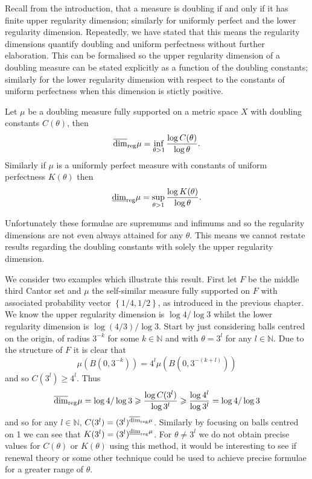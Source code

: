 Recall from the introduction, that a measure is doubling if and only if it has finite upper regularity dimension; similarly for uniformly perfect and the lower regularity dimension. Repeatedly, we have stated that this means the regularity dimensions quantify doubling and uniform perfectness without further elaboration. This can be formalised so the upper regularity dimension of a doubling measure can be stated explicitly as a function of the doubling constants; similarly for the lower regularity dimension with respect to the constants of uniform perfectness when this dimension is stictly positive. 

\begin{theorem}\label{ch-quantifying:equivalence}
Let $\mu$ be a doubling measure fully supported on a metric space $X$ with doubling constants $C(\theta)$, then $$\overline{\dim}_{\textup{reg}} \mu = \inf_{\theta > 1}\frac{\log C(\theta)}{\log \theta}.$$ Similarly if $\mu$ is a uniformly perfect measure with constants of uniform perfectness $K(\theta)$ then $$\underline{\dim}_{\textup{reg}} \mu = \sup_{\theta > 1} \frac{\log K(\theta)}{\log \theta}.$$
\end{theorem}


Unfortunately these formulae are supremums and infimums and so the regularity dimensions are not even always attained for any $\theta$. This means we cannot restate results regarding the doubling constants with solely the upper regularity dimension.

We consider two examples which illustrate this result. First let $F$ be the middle third Cantor set and $\mu$ the self-similar measure fully supported on $F$ with associated probability vector $\left\{ 1/4, 1/2 \right\}$, as introduced in the previous chapter. We know the upper regularity dimension is $\log 4 / \log 3$ whilst the lower regularity dimension is $\log(4/3) / \log 3$. Start by just considering balls centred on the origin, of radius $3^{-k}$ for some $k \in \mathbb{N}$ and with $\theta = 3^{l}$ for any $l \in \mathbb{N}$. Due to the structure of $F$ it is clear that 
\[
\mu(B(0, 3^{-k})) = 4^{l} \mu(B(0, 3^{-(k+l)}))
\]
and so $C(3^{l}) \ge 4^l$. Thus 
\[
\overline{\dim}_{\textup{reg}} \mu = \log 4 / \log 3 \geqslant \frac{\log C(3^{l})}{ \log 3^{l}} \geqslant \frac{ \log 4^l}{\log 3^l} =  \log 4 / \log 3
\]
and so for any $l \in \mathbb{N}$, $C(3^l) = (3^l)^{\overline{\dim}_{\textup{reg}} \mu}$. Similarly by focusing on balls centred on 1 we can see that $K(3^l) = (3^l)^{\underline{\dim}_{\textup{reg}} \mu}$. For $\theta \neq 3^l$ we do not obtain precise values for $C(\theta)$ or $K(\theta)$ using this method, it would be interesting to see if renewal theory or some other technique could be used to achieve precise formulae for a greater range of $\theta$. 

